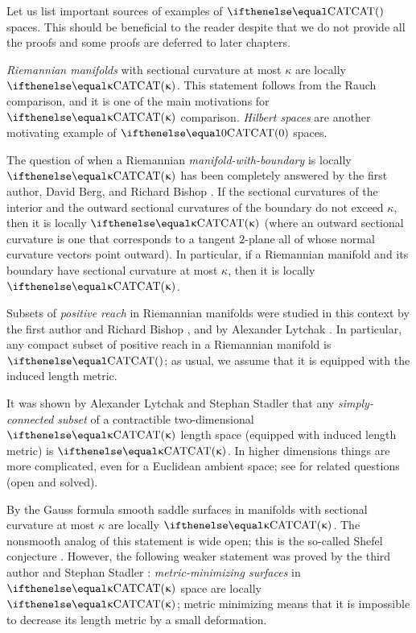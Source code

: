 Let us list important sources of examples of $\CAT{}$ spaces.
This should be beneficial to the reader despite that we do not provide all the proofs and some proofs are deferred to later chapters.

\textit{Riemannian manifolds} with sectional curvature at most $\kappa$ are locally $\CAT{\kappa}$.
This statement follows from the Rauch comparison, and it is one of the main motivations for $\CAT{\kappa}$ comparison.
\textit{Hilbert spaces} are another motivating example of $\CAT{0}$ spaces.

The question of when a Riemannian \textit{manifold-with-boundary} is locally $\CAT{\kappa}$ has been completely answered by the first author, David Berg, and Richard Bishop \cite{alexander-berg-bishop1993}.
If the sectional curvatures of the interior and the outward sectional curvatures of the boundary do not exceed $\kappa$, then it is locally $\CAT\kappa$ (where an outward sectional curvature is one that corresponds to a tangent $2$-plane all of whose normal curvature vectors point outward).
In particular, if a Riemannian manifold and its boundary have sectional curvature at most $\kappa$, then it is locally $\CAT{\kappa}$.

Subsets of \textit{positive reach} in  Riemannian manifolds were studied in this context by the first author and Richard Bishop \cite{alexander-bishop},
and by Alexander Lytchak \cite{lytchak2004}.
In particular, any compact subset of positive reach in a Riemannian manifold is $\CAT{}$;
as usual, we assume that it is equipped with the induced length metric.

It was shown by Alexander Lytchak and Stephan Stadler \cite{lytchak-stadler2021} that any \textit{simply-connected subset} of a contractible two-dimensional $\CAT{\kappa}$ length space (equipped with induced length metric) is $\CAT{\kappa}$.
In higher dimensions things are more complicated, even for a Euclidean ambient space;
see \cite[Chapter 4]{alexander-kapovitch-petrunin-CAT} for related questions (open and solved).

By the Gauss formula smooth saddle surfaces in manifolds with sectional curvature at most $\kappa$ are locally $\CAT\kappa$.
The nonsmooth analog of this statement is wide open; this is the so-called Shefel conjecture \cite[Chapter 4]{alexander-kapovitch-petrunin-CAT}.
However, the following weaker statement was proved by the third author and Stephan Stadler \cite{petrunin-stadler}: \textit{metric-minimizing surfaces} in $\CAT\kappa$ space are locally $\CAT\kappa$;
metric minimizing means that it is impossible to decrease its length metric by a small deformation.

